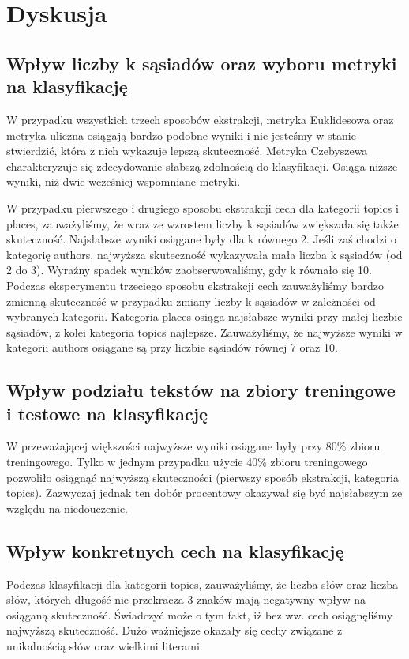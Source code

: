 \documentclass{classrep}
\begin{document}
\section{Dyskusja}

\subsection{Wpływ liczby k sąsiadów oraz wyboru metryki na klasyfikację}
W przypadku wszystkich trzech sposobów ekstrakcji, metryka Euklidesowa oraz metryka uliczna osiągają bardzo podobne wyniki i nie jesteśmy w stanie stwierdzić, która z nich wykazuje lepszą skuteczność. Metryka Czebyszewa charakteryzuje się zdecydowanie słabszą zdolnością do klasyfikacji. Osiąga niższe wyniki, niż dwie wcześniej wspomniane metryki.
 \newline

W przypadku pierwszego i drugiego sposobu ekstrakcji cech dla kategorii topics i places, zauważyliśmy, że wraz ze wzrostem liczby k sąsiadów zwiększała się także skuteczność. Najsłabsze wyniki osiągane były dla k równego 2. Jeśli zaś chodzi o kategorię authors, najwyższa skuteczność wykazywała mała liczba k sąsiadów (od 2 do 3). Wyraźny spadek wyników zaobserwowaliśmy, gdy k równało się 10. Podczas eksperymentu trzeciego sposobu ekstrakcji cech zauważyliśmy bardzo zmienną skuteczność w przypadku zmiany liczby k sąsiadów w zależności od wybranych kategorii. Kategoria places osiąga najsłabsze wyniki przy małej liczbie sąsiadów, z kolei kategoria topics najlepsze. Zauważyliśmy, że najwyższe wyniki w kategorii authors osiągane są przy liczbie sąsiadów równej 7 oraz 10. 


\subsection{Wpływ podziału tekstów na zbiory treningowe i testowe na klasyfikację}
W przeważającej większości najwyższe wyniki osiągane były przy 80\% zbioru treningowego. Tylko w jednym przypadku użycie 40\% zbioru treningowego pozwoliło osiągnąć najwyższą skuteczności (pierwszy sposób ekstrakcji, kategoria topics). Zazwyczaj jednak ten dobór procentowy okazywał się być najsłabszym ze względu na niedouczenie. 
\newline

\subsection{Wpływ konkretnych cech na klasyfikację}
Podczas klasyfikacji dla kategorii topics, zauważyliśmy, że liczba słów oraz liczba słów, których długość nie przekracza 3 znaków mają negatywny wpływ na osiąganą skuteczność. Świadczyć może o tym fakt, iż bez ww. cech osiągnęliśmy najwyższą skuteczność. Dużo ważniejsze okazały się cechy związane z unikalnością słów oraz wielkimi literami. \newline
\end{document}
